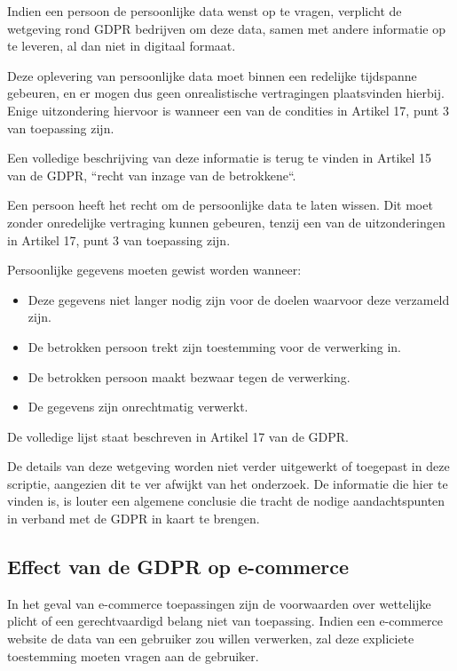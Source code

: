 Indien een persoon de persoonlijke data wenst op te vragen, verplicht de wetgeving rond GDPR  bedrijven om deze data, samen met andere informatie op te leveren, al dan niet in digitaal formaat.

Deze oplevering van persoonlijke data moet binnen een redelijke tijdspanne gebeuren, en er mogen dus geen onrealistische vertragingen plaatsvinden hierbij. Enige uitzondering hiervoor is wanneer een van de condities in Artikel 17, punt 3 van toepassing zijn. 

 Een volledige beschrijving van deze informatie is terug te vinden in Artikel 15 van de GDPR, ``recht van inzage van de betrokkene``. \autocite{Article15GDPR2018}

Een persoon heeft het recht om de persoonlijke data te laten wissen. Dit moet zonder onredelijke vertraging kunnen gebeuren, tenzij een van de uitzonderingen in Artikel 17, punt 3 van toepassing zijn.

Persoonlijke gegevens moeten gewist worden wanneer: 

\begin{itemize}
	\item Deze gegevens niet langer nodig zijn voor de doelen waarvoor deze verzameld zijn.
	\item De betrokken persoon trekt zijn toestemming voor de verwerking in.
	\item De betrokken persoon maakt bezwaar tegen de verwerking.
	\item De gegevens zijn onrechtmatig verwerkt.
\end{itemize}
\autocite{Article17GDPR2018}

De volledige lijst staat beschreven in Artikel 17 van de GDPR.

De details van deze wetgeving worden niet verder uitgewerkt of toegepast in deze scriptie, aangezien dit te ver afwijkt van het onderzoek. De informatie die hier te vinden is, is louter een algemene conclusie die tracht de nodige aandachtspunten in verband met de GDPR in kaart te brengen.

\subsection{Effect van de GDPR op e-commerce}
\label{subsec: Effect van de GDPR op e-commerce}

In het geval van e-commerce toepassingen zijn de voorwaarden over wettelijke plicht of een gerechtvaardigd belang niet van toepassing. Indien een e-commerce website de data van een gebruiker zou willen verwerken, zal deze expliciete toestemming moeten vragen aan de gebruiker.

